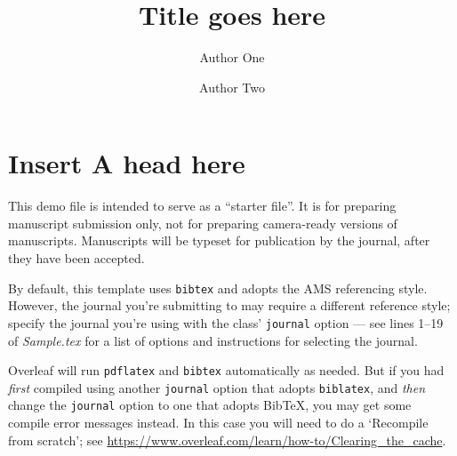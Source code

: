 \documentclass[journal=eds]{CAM-MODERN}%
\theoremstyle{definition}
\numberwithin{equation}{section}
\begin{document}
\begin{Frontmatter}

\title[Short Title]{Title goes here}

\author[1]{Author One}
\author[2]{Author Two}

\address[1]{, , }
\address[2]{, , . }




\end{Frontmatter}

\clearpage
\linenumbers

\section{Insert A head here}
This demo file is intended to serve as a ``starter file''. It is for preparing manuscript submission only, not for preparing camera-ready versions of manuscripts. Manuscripts will be typeset for publication by the journal, after they have been accepted.

By default, this template uses \texttt{bibtex} and adopts the AMS referencing style. However, the journal you’re submitting to may require a different reference style; specify the journal you're using with the class' \texttt{journal} option --- see lines 1--19 of \emph{Sample.tex} for a list of options and instructions for selecting the journal. 

Overleaf will run \texttt{pdflatex} and \texttt{bibtex} automatically as needed. But if you had \emph{first} compiled using another \texttt{journal} option that adopts \texttt{biblatex}, and \emph{then} change the \texttt{journal} option to one that adopts Bib\TeX{}, you may get some compile error messages instead. In this case you will need to do a `Recompile from scratch'; see \url{https://www.overleaf.com/learn/how-to/Clearing_the_cache}.
\end{document}
